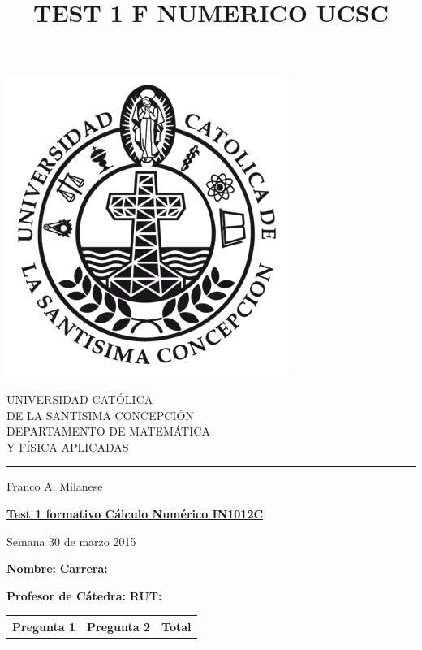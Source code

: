 \documentclass[11pt]{article}
\begin{document}
\title{TEST 1 F NUMERICO UCSC}

\begin{minipage}{0.15\textwidth}
\includegraphics[width=\textwidth]{ucsc.png}
\end{minipage}
\begin{minipage}{0.9\textwidth}
{UNIVERSIDAD CAT\'OLICA}\\ 
{DE LA SANT\'ISIMA CONCEPCI\'ON}\\
{DEPARTAMENTO DE MATEM\'ATICA}\\ 
{ Y F\'ISICA APLICADAS}\\
\rule{0.66\textwidth}{.5pt} Franco A. Milanese
\end{minipage}

\vspace*{0.5cm} \centerline {\bf\underline{Test 1 formativo C\'alculo Num\'erico IN1012C }}
\centerline{\textrm{Semana 30 de marzo 2015}}  

\vspace{0.2cm}
\textbf{Nombre:} \hspace{0.65\textwidth}\textbf{Carrera:}

\vspace{0.1cm}
\textbf{Profesor de C\'atedra:}\hspace{0.5\textwidth} \textbf{ RUT:}
 \begin{center}
 \begin{tabular}{||p{2cm}|p{2cm}|p{2cm}||}
 \hline
 Pregunta 1 &  Pregunta 2 &     Total\\
 \hline

  \vspace{1.5cm} & &       \\
 \hline
 \end{tabular}
 \end{center}
\end{document}
